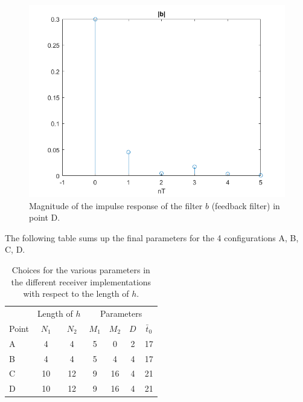 \documentclass[a4paper,11.5pt]{article}
\begin{document}
\begin{figure}[ht]
	\begin{center}   
		\includegraphics[width=\textwidth]{figs/D_b.png} 
		\caption{Magnitude of the impulse response of the filter $b$ (feedback filter) in point D.}
		\label{fig:D_b}
	\end{center}
\end{figure}

The following table sums up the final parameters for the 4 configurations A, B, C, D.

\begin{table}[htbp]
	\begin{center}
		\begin{tabular}{p{2.7cm}cccccc}
			\toprule
			& \multicolumn{2}{c}{Length of $h$} & \multicolumn{4}{c}{Parameters} \\
			\cmidrule(lr){2-3}
			\cmidrule(lr){4-7}
			Point & $N_1$ & $N_2$ & $M_1$ & $M_2$ & $D$ & $\bar{t}_0$ \\
			\midrule
			A &  4  &  4  & 5 & 0  & 2 & 17 \\
			B &  4  &  4  & 5 & 4  & 4 & 17 \\
			C & 10  &  12 & 9 & 16 & 4 & 21 \\
			D & 10  &  12 & 9 & 16 & 4 & 21 \\
			\bottomrule
		\end{tabular}
	\end{center}
	\label{tab:sumup}
	\caption{Choices for the various parameters in the different receiver implementations with respect to the length of $h$.}
\end{table} 
\end{document}
